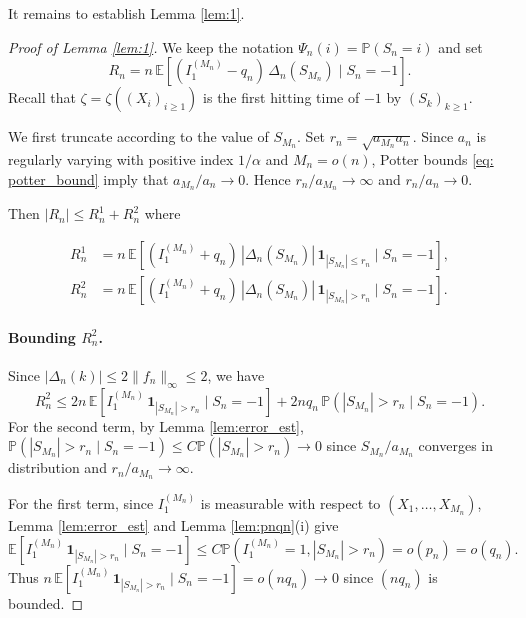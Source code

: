 \documentclass[a4paper,11pt]{article}
\newcommand{\E}{\mathbb{E}}
\DeclareRobustCommand{\P}{\mathbb{P}}
\DeclareRobustCommand{\1}{\mathbf{1}}
\renewcommand\Pr[1]{\mathbb{P}\left(#1\right)}
\begin{document}
It remains to establish Lemma \ref{lem:1}.
\begin{proof}[Proof of Lemma \ref{lem:1}] We keep the notation $\Psi_{n}(i)=\Pr{S_{n}=i}$ and set 
$$R_{n} = n\,\E\!\left[(I_1^{(M_n)} - q_n)\,\Delta_{n}(S_{M_n}) \mid S_n = -1\right].$$
Recall that $\zeta=\zeta((X_{i})_{i \geq 1})$ is  the first hitting time of $-1$ by $(S_{k})_{k \geq 1}$.

 We first truncate according to the value of $S_{M_{n}}$. Set $r_n=\sqrt{a_{M_n}a_n}$. Since $a_n$ is regularly varying with positive
index $1/\alpha$ and $M_n=o(n)$, Potter bounds  \eqref{eq: potter_bound} imply that
$a_{M_n}/a_n\to0$. Hence $r_n/a_{M_n}\to\infty$ and $r_n/a_n\to0$.


Then $|R_n| \leq R_n^1 + R_n^2$ where

\begin{align*}
  R_n^1 &= n\,\E\!\left[(I_1^{(M_n)} + q_{n})\,|\Delta_{n}(S_{M_n})|\,\mathbf{1}_{|S_{M_n}|\leq r_n} \mid S_n=-1\right], \\
  R_n^2 &= n\,\E\!\left[(I_1^{(M_n)} + q_{n})\,|\Delta_{n}(S_{M_n})|\,\mathbf{1}_{|S_{M_n}|> r_n} \mid S_n=-1\right].
\end{align*}

\paragraph{Bounding $R_{n}^{2}$.}
Since $|\Delta_{n}(k)| \leq 2\|f_{n}\|_\infty \leq 2$, we have
\[
  R_n^2 \leq 2n\,\E\!\left[I_1^{(M_n)}\,\mathbf{1}_{|S_{M_n}|>r_n} \mid S_n=-1\right] + 2n q_{n}\,\P(|S_{M_n}|>r_n \mid S_n=-1).
\]
For the second term, by Lemma \ref{lem:error_est}, $\P(|S_{M_n}|>r_n \mid S_n=-1) \leq C \P(|S_{M_n}|>r_n) \rightarrow 0$ since $S_{M_{n}}/a_{M_{n}}$ converges in distribution and $r_{n}/a_{M_{n}} \rightarrow\infty$.



For the first term, since $I_1^{(M_n)}$ is measurable with respect to $(X_1, \ldots, X_{M_n})$, Lemma \ref{lem:error_est} and Lemma \ref{lem:pnqn}\textup{(i)} give
$$ \E\!\left[I_1^{(M_n)}\,\mathbf{1}_{|S_{M_n}|>r_n} \mid S_n=-1\right] \le C \P(I_1^{(M_n)}=1, |S_{M_n}|>r_n) = o(p_n) = o(q_n). $$
Thus $n\,\E\!\left[I_1^{(M_n)}\,\mathbf{1}_{|S_{M_n}|>r_n} \mid S_n=-1\right] = o(nq_n) \to 0$ since $(nq_n)$ is bounded.


\end{proof}
\end{document}
